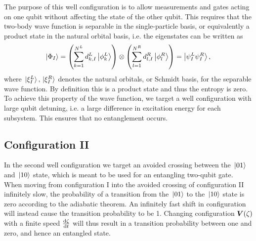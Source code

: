 \documentclass[twocolumn,superscriptaddress,unsortedaddress,
 amsmath,amssymb,
 aps,
]{revtex4-2}
\begin{document}
        The purpose of this well configuration is to allow measurements and gates acting on one qubit without affecting the state of the other qubit. This requires that the two-body wave function is separable in the single-particle basis, or equivalently a product state in the natural orbital basis, i.e. the eigenstates can be written as
        \begin{align*}
            \ket{\Phi_I}
            = \qty(
                \sum_{k = 1}^{N^L}
                d^L_{k, I} \ket{\phi^L_k}
            ) \otimes \qty(
                \sum_{l = 1}^{N^R}
                d^R_{l, I} \ket{\phi^R_l}
            )
            = \ket{\psi^L_I \psi^{R}_I},
        \end{align*}
        where $\ket*{\xi^L_I}, \ket*{\xi^R_I}$ denotes the natural orbitals, or
        Schmidt basis, for the separable wave function. By definition this is a product state and thus the entropy is zero. To achieve this property of the wave function, we target a well configuration with large qubit detuning, i.e. a large difference in excitation energy for each subsystem. This ensures that no entanglement occurs.  %


    \subsection{Configuration II}
        In the second well configuration we target an avoided crossing between the $\ket*{01}$ and
        $\ket*{10}$ state, which is meant to be used for an entangling two-qubit gate. When moving from configuration I into the avoided crossing of configuration II infinitely slow, the probability of a transition from the $\ket*{01}$ to the $\ket*{10}$ state is zero according to the adiabatic theorem. An infinitely fast shift in configuration will instead cause the transition probability to be 1. Changing configuration $\vb*{V}(\zeta)$ with a finite speed $\dv{\zeta}{t}$ will thus result in a transition probability between one and zero, and hence an entangled state. %
        
\end{document}
